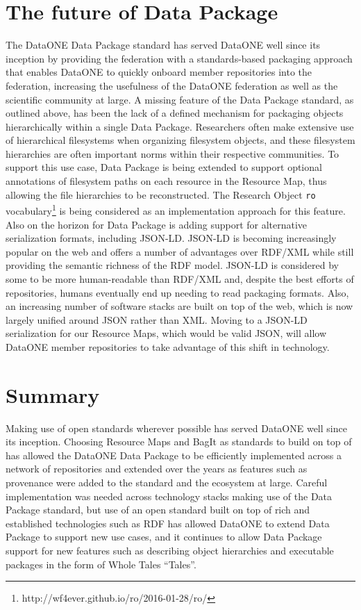 \documentclass[conference]{IEEEtran}
\begin{document}
\section{The future of Data Package}

The DataONE Data Package standard has served DataONE well since its inception by providing the federation with a standards-based packaging approach that enables DataONE to quickly onboard member repositories into the federation, increasing the usefulness of the DataONE federation as well as the scientific community at large.
A missing feature of the Data Package standard, as outlined above, has been the lack of a defined mechanism for packaging objects hierarchically within a single Data Package.
Researchers often make extensive use of hierarchical filesystems when organizing filesystem objects, and these filesystem hierarchies are often important norms within their respective communities.
To support this use case, Data Package is being extended to support optional annotations of filesystem paths on each resource in the Resource Map, thus allowing the file hierarchies to be reconstructed.
The Research Object \texttt{ro} vocabulary\footnote{http://wf4ever.github.io/ro/2016-01-28/ro/} is being considered as an implementation approach for this feature.
Also on the horizon for Data Package is adding support for alternative serialization formats, including JSON-LD.
JSON-LD is becoming increasingly popular on the web and offers a number of advantages over RDF/XML while still providing the semantic richness of the RDF model.
JSON-LD is considered by some to be more human-readable than RDF/XML and, despite the best efforts of repositories, humans eventually end up needing to read packaging formats.
Also, an increasing number of software stacks are built on top of the web, which is now largely unified around JSON rather than XML.
Moving to a JSON-LD serialization for our Resource Maps, which would be valid JSON, will allow DataONE member repositories to take advantage of this shift in technology.

\section{Summary}

Making use of open standards wherever possible has served DataONE well since its inception.
Choosing Resource Maps and BagIt as standards to build on top of has allowed the DataONE Data Package to be efficiently implemented across a network of repositories and extended over the years as features such as provenance were added to the standard and the ecosystem at large.
Careful implementation was needed across technology stacks making use of the Data Package standard, but use of an open standard built on top of rich and established technologies such as RDF has allowed DataONE to extend Data Package to support new use cases, and it continues to allow Data Package support for new features such as describing object hierarchies and executable packages in the form of Whole Tales “Tales”.
\end{document}
